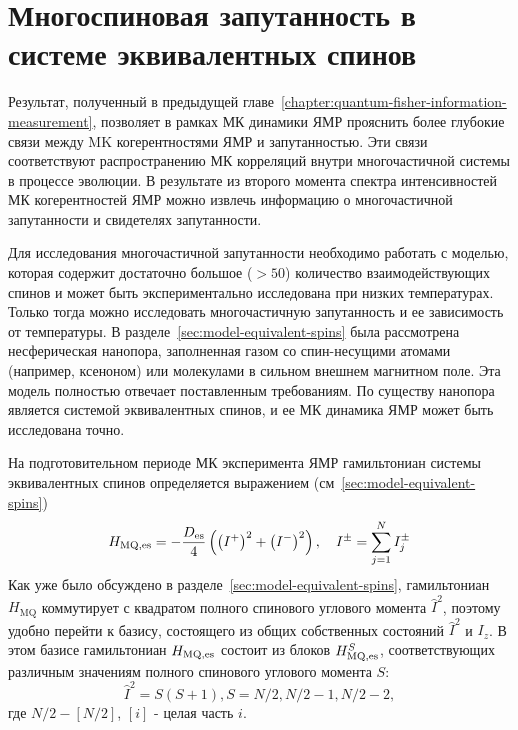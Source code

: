 \chapter{Многоспиновая запутанность в системе эквивалентных спинов}
\label{chapter:manyparticle-entanglement-in-nanopore}
%



Результат, полученный в предыдущей главе~\ref{chapter:quantum-fisher-information-measurement},
позволяет в рамках МК динамики ЯМР прояснить более глубокие связи между MK когерентностями ЯМР и запутанностью.
Эти связи соответствуют распространению МК корреляций внутри многочастичной системы в процессе эволюции.
В результате из второго момента спектра интенсивностей МК когерентностей ЯМР
можно извлечь информацию о многочастичной запутанности и свидетелях запутанности.

Для исследования многочастичной запутанности необходимо работать с моделью,
которая содержит достаточно большое ($>50$) количество взаимодействующих спинов
и может быть экспериментально исследована при низких температурах.
Только тогда можно исследовать многочастичную запутанность и ее зависимость от температуры.
В разделе~\ref{sec:model-equivalent-spins} была рассмотрена несферическая нанопора,
заполненная газом со спин-несущими атомами (например, ксеноном) или молекулами в сильном внешнем магнитном поле.
Эта модель полностью отвечает поставленным требованиям.
По существу нанопора является системой эквивалентных спинов,
и ее МК динамика ЯМР может быть исследована точно.

На подготовительном периоде МК эксперимента ЯМР гамильтониан системы эквивалентных спинов
определяется выражением (см~\ref{sec:model-equivalent-spins})
\begin{equation}\label{eq:mq-hamiltoninan-equivalent-spins}
  H_\mathrm{MQ,es} = - \frac{D_\mathrm{es}}{4} \left(  \left( I^+ \right)^2 + \left( I^- \right)^2  \right), \quad I^\pm = \sum\limits_{j=1}^{N} I^{\pm}_j
\end{equation}
%
\hmqEquivalentSpinsExplanatoryNote
Как уже было обсуждено в разделе~\ref{sec:model-equivalent-spins},
гамильтониан $H_\mathrm{MQ}$
коммутирует с квадратом полного спинового углового момента $\hat I^2$,
поэтому удобно перейти к базису,
состоящего из общих собственных состояний $\hat I^2$ и $I_z$.
В этом базисе гамильтониан $H_\mathrm{MQ,es}$ состоит из блоков $H_\mathrm{MQ,es}^S$, соответствующих различным значениям полного спинового углового момента $S$:
\begin{equation}
  \hat I^2 = S(S+1), S = N/2, N/2-1, N/2-2,
\end{equation}
где
$N/2 - [N/2]$, $[i]$ - целая часть $i$.

